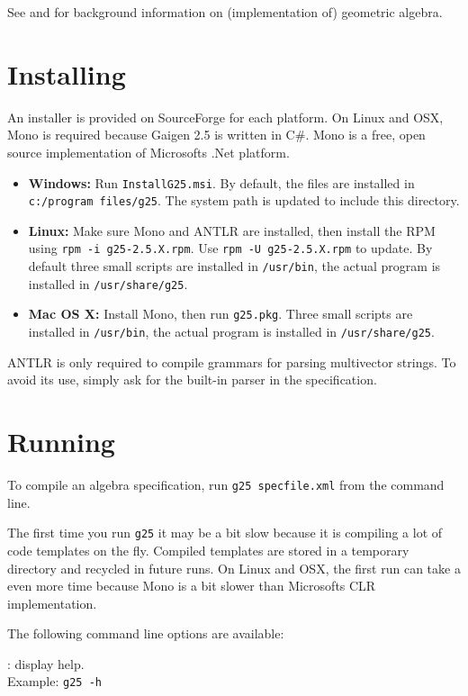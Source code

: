 \documentclass[10pt, a4paper]{article}
\begin{document}
See \cite{GA4CS} and \cite{fontijnePhD} for background information on (implementation of) geometric algebra.


\section{Installing}

An installer is provided on SourceForge for each platform.
On Linux and OSX, Mono is required because Gaigen 2.5 is written in C\#.
Mono is a free, open source implementation of Microsofts .Net platform.

\begin{itemize}
\item {\bf Windows: } Run {\tt InstallG25.msi}. By default, the files are installed in {\tt c:/program files/g25}.
The system path is updated to include this directory.
\item {\bf Linux: } Make sure Mono and ANTLR are installed, then install the RPM using 
{\tt rpm -i g25-2.5.X.rpm}. Use {\tt rpm -U g25-2.5.X.rpm} to update.
By default three small scripts are installed in {\tt /usr/bin}, the actual program is installed in {\tt /usr/share/g25}.
\item {\bf Mac OS X:} Install Mono, then run {\tt g25.pkg}. Three small scripts are installed in {\tt /usr/bin}, the actual 
program is installed in {\tt /usr/share/g25}.
\end{itemize}

ANTLR is only required to compile grammars for parsing multivector strings.
To avoid its use, simply ask for the built-in parser in the specification.

\section{Running}

To compile an algebra specification, run {\tt g25 specfile.xml} from the command line.
	
The first time you run {\tt g25} it may be a bit slow because it is compiling
a lot of code templates on the fly. Compiled templates are stored in a temporary 
directory and recycled in future runs.
On Linux and OSX, the first run can take a even more time because Mono is a bit
slower than Microsofts CLR implementation.

	
The following command line options are available:

\vspace*{2mm}

: display help.\\
Example: {\tt g25 -h}
\end{document}
